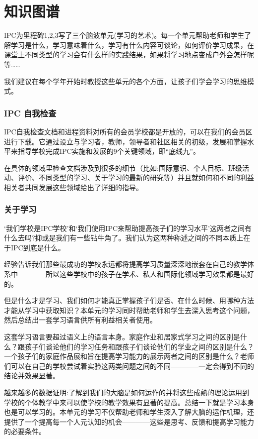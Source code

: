 \chapter{知识图谱}
    IPC为里程碑1,2,3写了三个脑波单元(学习的艺术)。每一个单元帮助老师和学生了解学习是什么，学习意味着什么，学习有什么内容可谈论，如何评价学习成果，在课堂上不同类型的学习会有什么样的实践结果，如果将学习地点变成户外会怎样呢等……
\par
    我们建议在每个学年开始时教授这些单元的各个方面，让孩子们学会学习的思维模式。\par
\subsection{IPC 自我检查}
    IPC自我检查文档和进程资料对所有的会员学校都是开放的，可以在我们的会员区进行下载。它通过设立与学习者，教师，领导者和社区相关的初级，发展和掌握水平来指导学校完成IPC实施和发展的9个关键领域，即“底线九”。\par
    在具体的领域里检查文档涉及到很多的细节（比如:国际意识、个人目标、班级活动、评价、不同类型的学习、关于学习的最新的研究等）并且就如何和不同的利益相关者共同发展这些领域给出了详细的指导。

\subsection{关于学习}
    ‘我们学校是IPC学校’和‘我们使用IPC来帮助提高孩子们的学习水平’这两者之间有什么去吗?抑或是我们有一些钻牛角了。我们认为这两种称述之间的不同本质上在于IPC到底是什么。 \par
     经验告诉我们那些最成功的学校永远都将提高学习质量深深地嵌套在自己的教学体系中————所以这些学校中的孩子在学术、私人和国际化领域学习效果都是最好的。\par
     但是什么才是学习、我们如何才能真正掌握孩子们是否、在什么时候、用哪种方法才能从学习中获取知识？本单元的学习同时帮助老师和学生去深入思考这个问题，然后总结出一套学习语言供所有利益相关者使用。  \par
     这套学习语言要超过语义上的语言本身。家庭作业和居家式学习之间的区别是什么？跟孩子们谈论他们的学习任务和跟孩子们谈论他们的学业之间的区别是什么？一个孩子们的家庭作品展和旨在提高学习能力的展示两者之间的区别是什么？老师们可以在自己的学校尝试着实验这两类问题之间的不同————一定会得到不同的结论并效果显著。\par
     越来越多的数据证明:了解到我们的大脑是如何运作的并将这些成熟的理论运用到学校的个体教学中来可以使学校的教学效果有显著的提高。总结一下就是学习本身也是可以学习的。本单元的学习不仅帮助老师和学生深入了解大脑的运作机理，还提供了一个提高每一个人元认知的机会————这些是思考、反馈和提高学习能力的必要条件。 \par
 
